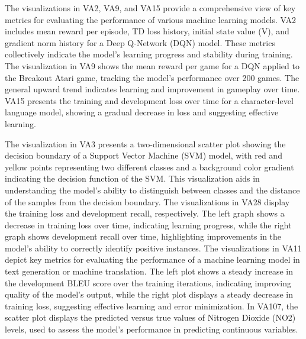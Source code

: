 The visualizations in VA2, VA9, and VA15 provide a comprehensive view of key metrics for evaluating the performance of various machine learning models. VA2 includes mean reward per episode, TD loss history, initial state value (V), and gradient norm history for a Deep Q-Network (DQN) model. These metrics collectively indicate the model's learning progress and stability during training. The visualization in VA9 shows the mean reward per game for a DQN applied to the Breakout Atari game, tracking the model's performance over 200 games. The general upward trend indicates learning and improvement in gameplay over time. VA15 presents the training and development loss over time for a character-level language model, showing a gradual decrease in loss and suggesting effective learning.

The visualization in VA3 presents a two-dimensional scatter plot showing the decision boundary of a Support Vector Machine (SVM) model, with red and yellow points representing two different classes and a background color gradient indicating the decision function of the SVM. This visualization aids in understanding the model's ability to distinguish between classes and the distance of the samples from the decision boundary. The visualizations in VA28 display the training loss and development recall, respectively. The left graph shows a decrease in training loss over time, indicating learning progress, while the right graph shows development recall over time, highlighting improvements in the model's ability to correctly identify positive instances. The visualizations in VA11 depict key metrics for evaluating the performance of a machine learning model in text generation or machine translation. The left plot shows a steady increase in the development BLEU score over the training iterations, indicating improving quality of the model's output, while the right plot displays a steady decrease in training loss, suggesting effective learning and error minimization. In VA107, the scatter plot displays the predicted versus true values of Nitrogen Dioxide (NO2) levels, used to assess the model's performance in predicting continuous variables.


